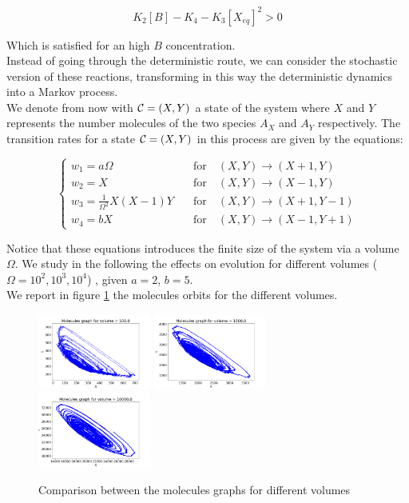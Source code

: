 $$ K_2 [B] - K_4 - K_3[X_{eq}]^2 > 0 $$

Which is satisfied for an high $B$ concentration. \\

Instead of going through the deterministic route, we can consider the stochastic version of these reactions, transforming in this way the deterministic dynamics into a Markov process. \\

We denote from now with $ \mathcal{C}=(X,Y)$ a state of the system where $X$ and $Y$ represents the number molecules of the two species $A_X$ and $A_Y$
respectively. The transition rates for a state $ \mathcal{C}=(X,Y)$ in this process are given by the equations:

$$
\begin{cases}
    w_{1} = a\Omega \quad &\text{for}\quad(X,Y)\to(X+1,Y)\\
    w_{2} = X\quad&\text{for}\quad(X,Y)\to(X-1,Y)\\
    w_{3} = \frac{1}{\Omega^{2}}X(X-1)Y\quad&\text{for}\quad(X,Y)\to(X+1,Y-1)\\
    w_{4} = bX\quad&\text{for}\quad(X,Y)\to(X-1,Y+1)
\end{cases}
$$

Notice that these equations introduces the finite size of the system via a volume $\Omega$. 
We study in the following the effects on evolution for different volumes ($\Omega = 10^2, 10^3, 10^4$) , given $a = 2$, $b = 5$.  \\
We report in figure \ref{lec7:moleculesxy_comparison} the molecules orbits for the different volumes.

\begin{figure}[t!]
    \centering
    \includegraphics[width=0.33\textwidth]{FIG/exercise_7_images/gillespiexy_volume100.0.png} \hspace{0.5cm}
    \includegraphics[width=0.33\textwidth]{FIG/exercise_7_images/gillespiexy_volume1000.0.png} \hspace{0.5cm}
    \includegraphics[width=0.33\textwidth]{FIG/exercise_7_images/gillespiexy_volume10000.0.png}
    \caption{Comparison between the molecules graphs for different volumes}
    \label{lec7:moleculesxy_comparison}
\end{figure}

